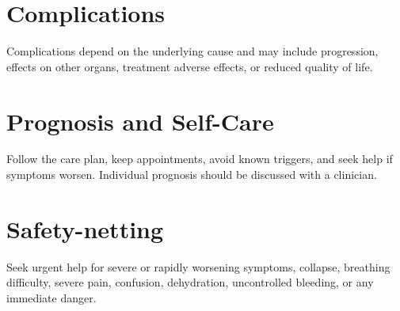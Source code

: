 \section*{Complications}
Complications depend on the underlying cause and may include progression, effects on other organs, treatment adverse effects, or reduced quality of life.

\section*{Prognosis and Self-Care}
Follow the care plan, keep appointments, avoid known triggers, and seek help if symptoms worsen. Individual prognosis should be discussed with a clinician.
\section*{Safety-netting}
Seek urgent help for severe or rapidly worsening symptoms, collapse, breathing difficulty, severe pain, confusion, dehydration, uncontrolled bleeding, or any immediate danger.
